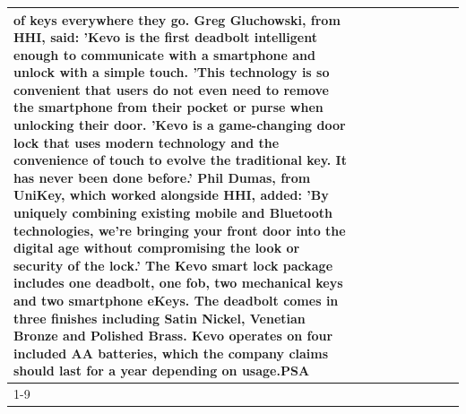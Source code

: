 \begin{table}[H]
\begin{tabular}{lllrlllll}
of keys everywhere they go. Greg Gluchowski, from HHI, said: 'Kevo is the first deadbolt intelligent enough to communicate with a smartphone and unlock with a simple touch. 'This technology is so convenient that users do not even need to remove the smartphone from their pocket or purse when unlocking their door. 'Kevo is a game-changing door lock that uses modern technology and the convenience of touch to evolve the traditional key. It has never been done before.' Phil Dumas, from UniKey, which worked alongside HHI, added: 'By uniquely combining existing mobile and Bluetooth technologies, we’re bringing your front door into the digital age without compromising the look or security of the lock.' The Kevo smart lock package includes one deadbolt, one fob, two mechanical keys and two smartphone eKeys. The deadbolt comes in three finishes including Satin Nickel, Venetian Bronze and Polished Brass. Kevo operates on four included AA batteries, which the company claims should last for a year depending on usage.PSA \\
\cline{1-9}

\end{tabular}
\end{table}
